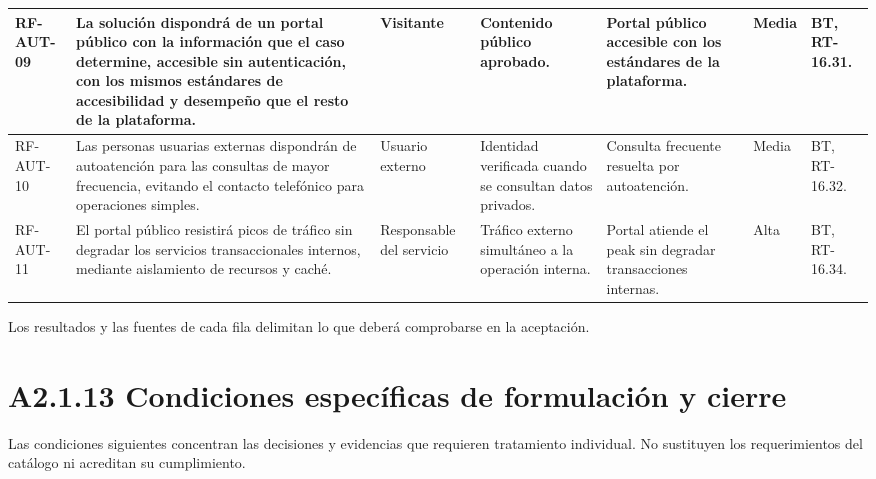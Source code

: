 \begin{longtable}{|L{0.080645\AnchoTablaAnexo}|L{0.262097\AnchoTablaAnexo}|L{0.100806\AnchoTablaAnexo}|L{0.145161\AnchoTablaAnexo}|L{0.173387\AnchoTablaAnexo}|L{0.060484\AnchoTablaAnexo}|L{0.177420\AnchoTablaAnexo}|}
RF-\allowbreak{}AUT-\allowbreak{}09 &
La solución dispondrá de un portal público con la información que el caso determine, accesible sin autenticación, con los mismos estándares de accesibilidad y desempeño que el resto de la plataforma. &
Visitante &
Contenido público aprobado. &
Portal público accesible con los estándares de la plataforma. &
Media &
BT, RT-16.31. \\ \hline

RF-\allowbreak{}AUT-\allowbreak{}10 &
Las personas usuarias externas dispondrán de autoatención para las consultas de mayor frecuencia, evitando el contacto telefónico para operaciones simples. &
Usuario externo &
Identidad verificada cuando se consultan datos privados. &
Consulta frecuente resuelta por autoatención. &
Media &
BT, RT-16.32. \\ \hline

RF-\allowbreak{}AUT-\allowbreak{}11 &
El portal público resistirá picos de tráfico sin degradar los servicios transaccionales internos, mediante aislamiento de recursos y caché. &
Responsable del servicio &
Tráfico externo simultáneo a la operación interna. &
Portal atiende el peak sin degradar transacciones internas. &
Alta &
BT, RT-16.34. \\ \hline

\end{longtable}

Los resultados y las fuentes de cada fila delimitan lo que deberá comprobarse en la aceptación.

\clearpage\section*{A2.1.13 Condiciones específicas de formulación y cierre}

Las condiciones siguientes concentran las decisiones y evidencias que requieren tratamiento individual. No sustituyen los requerimientos del catálogo ni acreditan su cumplimiento.


